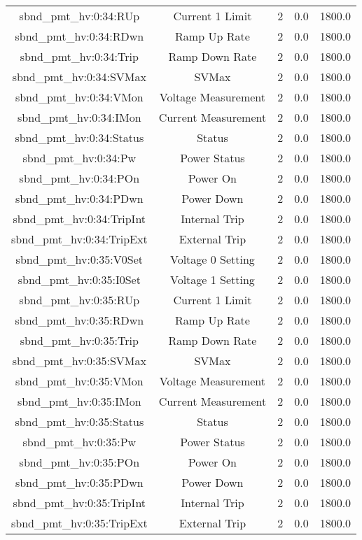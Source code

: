 \begin{center}
\begin{longtable}{c | c c c c }
sbnd\_pmt\_hv:0:34:RUp & Current 1 Limit & 2 & 0.0 & 1800.0\\ 
sbnd\_pmt\_hv:0:34:RDwn & Ramp Up Rate & 2 & 0.0 & 1800.0\\ 
sbnd\_pmt\_hv:0:34:Trip & Ramp Down Rate & 2 & 0.0 & 1800.0\\ 
sbnd\_pmt\_hv:0:34:SVMax & SVMax & 2 & 0.0 & 1800.0\\ 
sbnd\_pmt\_hv:0:34:VMon & Voltage Measurement & 2 & 0.0 & 1800.0\\ 
sbnd\_pmt\_hv:0:34:IMon & Current Measurement & 2 & 0.0 & 1800.0\\ 
sbnd\_pmt\_hv:0:34:Status & Status & 2 & 0.0 & 1800.0\\ 
sbnd\_pmt\_hv:0:34:Pw & Power Status & 2 & 0.0 & 1800.0\\ 
sbnd\_pmt\_hv:0:34:POn & Power On & 2 & 0.0 & 1800.0\\ 
sbnd\_pmt\_hv:0:34:PDwn & Power Down & 2 & 0.0 & 1800.0\\ 
sbnd\_pmt\_hv:0:34:TripInt & Internal Trip & 2 & 0.0 & 1800.0\\ 
sbnd\_pmt\_hv:0:34:TripExt & External Trip & 2 & 0.0 & 1800.0\\ 
sbnd\_pmt\_hv:0:35:V0Set & Voltage 0 Setting & 2 & 0.0 & 1800.0\\ 
sbnd\_pmt\_hv:0:35:I0Set & Voltage 1 Setting & 2 & 0.0 & 1800.0\\ 
sbnd\_pmt\_hv:0:35:RUp & Current 1 Limit & 2 & 0.0 & 1800.0\\ 
sbnd\_pmt\_hv:0:35:RDwn & Ramp Up Rate & 2 & 0.0 & 1800.0\\ 
sbnd\_pmt\_hv:0:35:Trip & Ramp Down Rate & 2 & 0.0 & 1800.0\\ 
sbnd\_pmt\_hv:0:35:SVMax & SVMax & 2 & 0.0 & 1800.0\\ 
sbnd\_pmt\_hv:0:35:VMon & Voltage Measurement & 2 & 0.0 & 1800.0\\ 
sbnd\_pmt\_hv:0:35:IMon & Current Measurement & 2 & 0.0 & 1800.0\\ 
sbnd\_pmt\_hv:0:35:Status & Status & 2 & 0.0 & 1800.0\\ 
sbnd\_pmt\_hv:0:35:Pw & Power Status & 2 & 0.0 & 1800.0\\ 
sbnd\_pmt\_hv:0:35:POn & Power On & 2 & 0.0 & 1800.0\\ 
sbnd\_pmt\_hv:0:35:PDwn & Power Down & 2 & 0.0 & 1800.0\\ 
sbnd\_pmt\_hv:0:35:TripInt & Internal Trip & 2 & 0.0 & 1800.0\\ 
sbnd\_pmt\_hv:0:35:TripExt & External Trip & 2 & 0.0 & 1800.0\\ 

\end{longtable}
\end{center}
